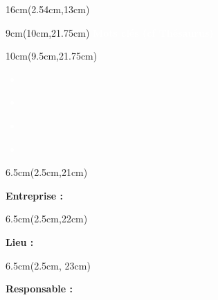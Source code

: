 \begin{titlepage}
    \begin{textblock*}{16cm}(2.54cm,13cm)
        {
            \normalsize
            \makeatletter
            \setlength{\parindent}{0pt}
            \titletext
        }
    \end{textblock*}

    \begin{textblock*}{9cm}(10cm,21.75cm)
        \normalsize
        \centering
        \textbf{\textcolor{white}{Mots clés (cf Thésaurus)}}
    \end{textblock*}

    \begin{textblock*}{10cm}(9.5cm,21.75cm)
        \fontsize{11pt}{13.2pt}\selectfont
        \textcolor{white}{
            \begin{itemize}[label=\textcolor{white}{\textbullet}]
                \item \textbf{\theKone}
                \item \textbf{\theKtwo}
                \item \textbf{\theKthree}
                \item \textbf{\theKfourth}
            \end{itemize}
        }
    \end{textblock*}

    \begin{textblock*}{6.5cm}(2.5cm,21cm)
        \small
        \raggedright
        \justify
        \textbf{\textcolor{bleuRoiUTT}{Entreprise :} \theEntreprise}
    \end{textblock*}

    \begin{textblock*}{6.5cm}(2.5cm,22cm)
        \small
        \raggedright
        \justify
        \textbf{\textcolor{bleuRoiUTT}{Lieu :} \textit{\mapAddr{\theLieu}}}
    \end{textblock*}

    \begin{textblock*}{6.5cm}(2.5cm, 23cm)
        \small
        \raggedright
        \justify
        \textbf{\textcolor{bleuRoiUTT}{Responsable :} \theREntre}
    \end{textblock*}

\end{titlepage}

\clearpage %